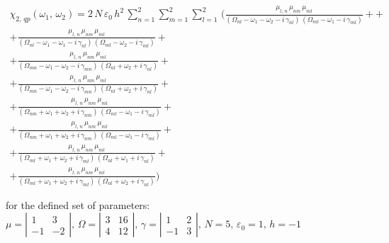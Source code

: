 \documentclass[12pt,twoside,a4paper]{article}
\numberwithin{equation}{subsection}
\numberwithin{figure}{subsection}
\begin{document}
\begin{multline} \label{hcc_qp2}
  \chi_{2, \,qp}({\omega_{1}}, \,{\omega_{2}}) = 
  2\,N\,\varepsilon_{0}\,h^{2}\,\sum_{n=1}^{2}\sum_{m=1}^{2}\sum_{l=1}^{2}\,
  (
       \frac {{\mu_{l,\,n}}\,{\mu_{nm}}\,{\mu_{ml}}}
      {({\Omega_{nl}} - \omega_1 - \omega_2 - i\,{\gamma_{nl}})\,({\Omega_{ml}} - \omega_1 - i\,{\gamma_{ml}})} +
+ \\ + \frac {{\mu_{l, \,n}}\,{\mu_{nm}}\,{\mu_{ml}}}
      {({\Omega_{nl}} - \omega_1 - \omega_1 - i\,{\gamma_{nl}})\,({\Omega_{ml}} - \omega_2 - i\,{\gamma_{ml}})}
+ \\ + \frac {{\mu_{l, \,n}}\,{\mu_{nm}}\,{\mu_{ml}}}
      {({\Omega_{mn}} - \omega_1 - \omega_2 - i\,{\gamma_{mn}})\,({\Omega_{nl}} + \omega_2 + i\,{\gamma_{nl}})}
+ \\ + \frac {{\mu_{l, \,n }}\,{\mu_{nm}}\,{\mu_{ml}}} 
      {({\Omega_{mn}} - \omega_1 - \omega_2 - i\,{\gamma_{mn}})\,({\Omega_{nl}} + \omega_2 + i\,{\gamma_{nl}})} 
+ \\ + \frac {{\mu_{l, \,n}}\,{\mu_{nm}}\,{\mu_{ml}}}
      {({\Omega_{nm}} + \omega_1 + \omega_2 + i\,{\gamma_{nm}})\,({\Omega_{ml}} - \omega_1 - i\,{\gamma_{ml}})}
+\\ + \frac {{\mu_{l, \,n}}\,{\mu_{ nm}}\,{\mu_{ml}}}
      {({\Omega_{nm}} + \omega_1 + \omega_2 + i\,{\gamma_{nm}})\,({\Omega_{ml}} - \omega_1 - i\,{\gamma_{ml}})} 
+ \\ + \frac {{\mu_{l, \,n}}\,{\mu_{nm}}\,{\mu_{ml}}}
      {({\Omega_{ml}} + \omega_1 + \omega_2 + i\,{\gamma_{ml}})\,({\Omega_{nl}} + \omega_1 + i\,{\gamma_{nl}})}
+\\ + \frac {{\mu_{l, \,n}}\,{\mu_{nm}}\,{\mu_{ml}}}
      {({\Omega_{ml}} + \omega_1 + \omega_2 + i\,{\gamma_{ml}})\,({\Omega_{nl}} + \omega_2 + i\,{\gamma_{nl}})}
  )  
\end{multline}

for the defined set of parameters: \\

$\mu = \left| \begin{array}{cc} 
    1 & 3 \\ -1 & -2 
  \end{array} \right|,\, 
  \Omega = \left| \begin{array}{cc} 
    3 & 16 \\ 4 & 12 
  \end{array} \right|,\,
  \gamma = \left| \begin{array}{cc} 
  1 & 2 \\ -1 & 3
  \end{array} \right|,\, N=5,\, {\varepsilon_{0}}=1,\,h= - 1$
\end{document}
